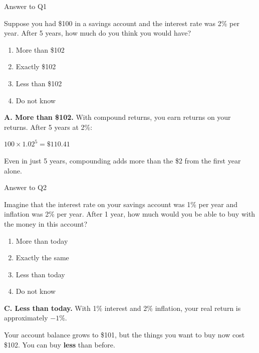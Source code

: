 \documentclass[9pt,english,aspectratio=169]{beamer}
\begin{document}
\begin{frame}{Answer to Q1}

  \begin{questionbox}
    Suppose you had \$100 in a savings account and the interest rate was 2\%
    per year. After 5 years, how much do you think you would have?
  \end{questionbox}

  \vspace{0.5em}
  \begin{enumerate}
    \item More than \$102
    \item Exactly \$102
    \item Less than \$102
    \item Do not know
  \end{enumerate}

  \pause
  \vspace{0.5em}
  \begin{answerbox}
    \textbf{A. More than \$102.} With compound returns, you earn returns on your
    returns. After 5 years at 2\%:

    \vspace{0.3em}
    \centering $100 \times 1.02^{5} = \$110.41$

    \vspace{0.3em}
    \raggedright Even in just 5 years, compounding adds more than the \$2 from the first year alone.
  \end{answerbox}

\end{frame}

\begin{frame}{Answer to Q2}

  \begin{questionbox}
    Imagine that the interest rate on your savings account was 1\% per year
    and inflation was 2\% per year. After 1 year, how much would you be able
    to buy with the money in this account?
  \end{questionbox}

  \vspace{0.5em}
  \begin{enumerate}
    \item More than today
    \item Exactly the same
    \item Less than today
    \item Do not know
  \end{enumerate}

  \pause
  \vspace{0.5em}
  \begin{answerbox}
    \textbf{C. Less than today.} With 1\% interest and 2\% inflation, your real
    return is approximately $-1$\%.

    \vspace{0.3em}
    Your account balance grows to \$101, but the things you want to buy now
    cost \$102. You can buy \textbf{less} than before.
  \end{answerbox}

\end{frame}
\end{document}

